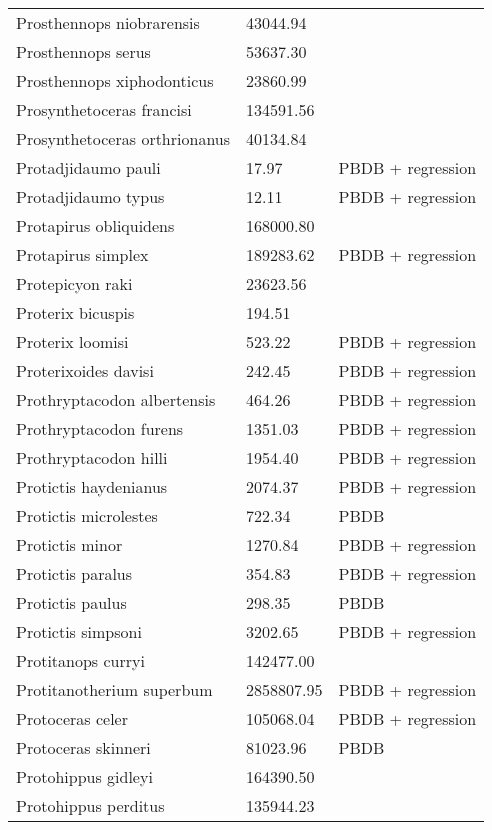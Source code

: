 \begin{center}
\begin{longtable}{p{} p{} p{} }
  Prosthennops niobrarensis & 43044.94 & \cite{Tomiya2013} \\ 
  Prosthennops serus & 53637.30 & \cite{Tomiya2013} \\ 
  Prosthennops xiphodonticus & 23860.99 & \cite{Tomiya2013} \\ 
  Prosynthetoceras francisi & 134591.56 & \cite{Tomiya2013} \\ 
  Prosynthetoceras orthrionanus & 40134.84 & \cite{Tomiya2013} \\ 
  Protadjidaumo pauli & 17.97 & PBDB + regression \\ 
  Protadjidaumo typus & 12.11 & PBDB + regression \\ 
  Protapirus obliquidens & 168000.80 & \cite{Rose1982a} \\ 
  Protapirus simplex & 189283.62 & PBDB + regression \\ 
  Protepicyon raki & 23623.56 & \cite{Tomiya2013} \\ 
  Proterix bicuspis & 194.51 & \cite{Coombs1979} \\ 
  Proterix loomisi & 523.22 & PBDB + regression \\ 
  Proterixoides davisi & 242.45 & PBDB + regression \\ 
  Prothryptacodon albertensis & 464.26 & PBDB + regression \\ 
  Prothryptacodon furens & 1351.03 & PBDB + regression \\ 
  Prothryptacodon hilli & 1954.40 & PBDB + regression \\ 
  Protictis haydenianus & 2074.37 & PBDB + regression \\ 
  Protictis microlestes & 722.34 & PBDB \\ 
  Protictis minor & 1270.84 & PBDB + regression \\ 
  Protictis paralus & 354.83 & PBDB + regression \\ 
  Protictis paulus & 298.35 & PBDB \\ 
  Protictis simpsoni & 3202.65 & PBDB + regression \\ 
  Protitanops curryi & 142477.00 & \cite{McKenna2011} \\ 
  Protitanotherium superbum & 2858807.95 & PBDB + regression \\ 
  Protoceras celer & 105068.04 & PBDB + regression \\ 
  Protoceras skinneri & 81023.96 & PBDB \\ 
  Protohippus gidleyi & 164390.50 & \cite{Tomiya2013} \\ 
  Protohippus perditus & 135944.23 & \cite{Tomiya2013} \\ 

\end{longtable}
\end{center}
